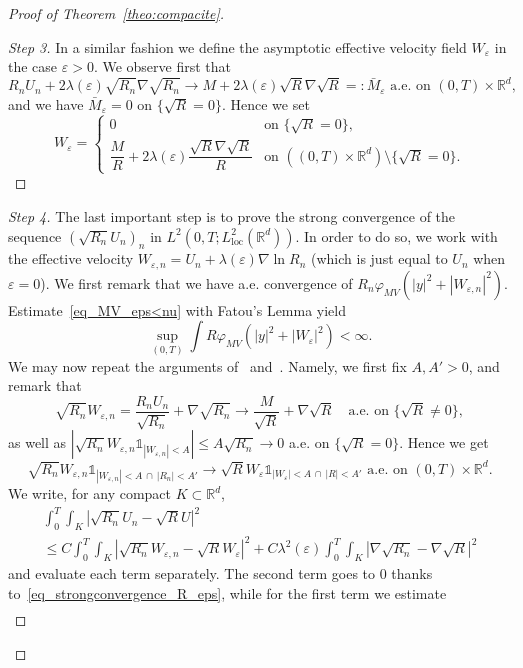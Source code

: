 \documentclass[10pt]{amsart}
\theoremstyle{definition}\newtheorem{defi}[theo]{Definition}\newtheorem{rema}[theo]{Remark}\newtheorem{exam}[theo]{Example}\newtheorem{exem}[theo]{Example}\newtheorem{nota}[theo]{Notation}
\newcommand*{\un}{\mathds{1}}
\newcommand*\R{\mathbb{R}}
\newcommand*{\loc}{\mathrm{loc}}
\newcommand*\<{\left\langle}
\renewcommand*\>{\right\rangle}
\renewcommand*\le{\leqslant}
\newcommand*\eps{\varepsilon}
\begin{document}
\begin{proof}[Proof of Theorem~\ref{theo:compacite}]
\begin{proof}[Step 3]
In a similar fashion we define the asymptotic effective velocity field $W_\eps$ in the case $\eps >0$. We observe first that
\[
R_n U_n + 2\lambda(\eps) \sqrt{R_n} \nabla \sqrt{R_n}
\to M + 2\lambda(\eps) \sqrt{R} \nabla \sqrt{R} =: \bar M_\eps
\text{ a.e. on } (0,T)\times \R^d,
\]
and we have $ \bar M_\eps = 0$ on $\{\sqrt{R}=0\}.$ Hence we set
\[
W_\eps =
\begin{cases}
0 & \text{on }\{\sqrt{R} = 0\},\\
\dfrac{M}{R} +2\lambda(\eps) \dfrac{ \sqrt{R} \nabla \sqrt{R} }{R}&
\text{on }\left((0,T) \times \mathbb R^d \right)\setminus \{\sqrt{R} = 0\}.
\end{cases}
\]
\let\qed\relax
\end{proof}

\begin{proof}[Step 4]
The last important step is to prove the strong convergence of the sequence $(\sqrt{R_n} U_n)_{n}$ in $L^2(0,T;L^2_{\loc}(\mathbb R^d)).$ In order to do so, we work with the effective velocity $ W_{\eps,n} = U_n + \lambda(\eps) \nabla \ln R_n$ (which is just equal to $U_n$ when $\eps = 0$). We first remark that we have a.e. convergence of ${R_n}\varphi_{MV}(|y|^2 + |W_{\eps,n}|^2)$. Estimate~\eqref{eq_MV_eps<nu} with Fatou's Lemma yield
\[
\sup_{(0,T)} \int R \varphi_{MV}(|y|^2 + |W_\eps|^2) < \infty.
\]
We may now repeat the arguments of~\cite[p.~445--446]{MelletVasseur} and~\cite{AS-comp}. Namely, we first fix $A,A' >0$, and remark that
\[
\sqrt{R_n} W_{\eps,n} = \frac{R_n U_n}{\sqrt{R_n}} + \nabla \sqrt{R_n}
\to \frac{M}{\sqrt{R}} + \nabla \sqrt{R} \quad
\text{a.e. on } \{ \sqrt R \neq 0 \},
\]
as well as $|\sqrt{R_n} W_{\eps,n} \un_{|W_{\eps,n}| < A } |
\le A \sqrt{R_n} \to 0 $ a.e. on $\{ \sqrt R = 0 \}$. Hence we get
\[
\sqrt{R_n} W_{\eps,n} \un_{|W_{\eps,n}| < A \, \cap \, |R_n| < A'} \rightarrow
\sqrt{R} W_{\eps} \un_{|W_{\eps}| < A \, \cap \, |R| < A'}
\text{ a.e. on $(0,T) \times\mathbb R^d$}.
\]
We write, for any compact $K \subset \R^d$,
\begin{multline*}
\int_{0}^T \int_K \left|\sqrt{R_n} U_n - \sqrt{R} U \right|^2 \\
\le C\int_{0}^T \int_K \left|\sqrt{R_n} W_{\eps,n} - \sqrt{R} W_{\eps} \right|^2 + C \lambda^2(\eps)\int_{0}^T \int_K \left|\nabla \sqrt{R_n} - \nabla \sqrt{R} \right|^2
\end{multline*}
and evaluate each term separately. The second term goes to $0$ thanks to~\eqref{eq_strongconvergence_R_eps}, while for the first term we estimate
\begin{multline}\label{eq:conv-RW}

\end{multline}
\end{proof}
\end{proof}
\end{document}
